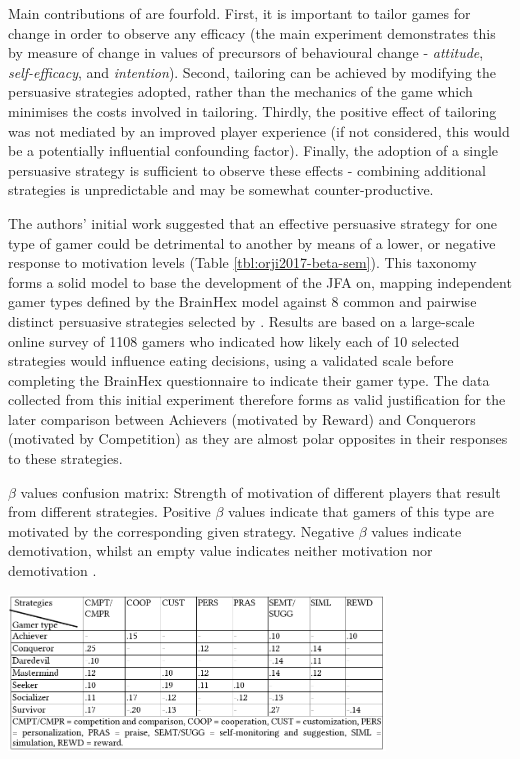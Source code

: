 \documentclass[11pt]{article}
\begin{document}
Main contributions of \citet{orji2017} are fourfold. First, it is important to tailor games for change in order to observe any efficacy (the main experiment demonstrates this by measure of change in values of precursors of behavioural change - \textit{attitude}, \textit{self-efficacy}, and \textit{intention}). Second, tailoring can be achieved by modifying the persuasive strategies adopted, rather than the mechanics of the game which minimises the costs involved in tailoring. Thirdly, the positive effect of tailoring was not mediated by an improved player experience (if not considered, this would be a potentially influential confounding factor). Finally, the adoption of a single persuasive strategy is sufficient to observe these effects - combining additional strategies is unpredictable and may be somewhat counter-productive.

The authors' initial work suggested that an effective persuasive strategy for one type of gamer could be detrimental to another by means of a lower, or negative response to motivation levels \citep{orji2013a} (Table \ref{tbl:orji2017-beta-sem}). This taxonomy forms a solid model to base the development of the JFA on, mapping independent gamer types defined by the BrainHex model \citep{nacke2014} against 8 common and pairwise distinct persuasive strategies selected by \citet{gerling2014}. Results are based on a large-scale online survey of 1108 gamers who indicated how likely each of 10 selected strategies would influence eating decisions, using a validated scale \citep{drozd2012} before completing the BrainHex questionnaire to indicate their gamer type. The data collected from this initial experiment therefore forms as valid justification for the later comparison between Achievers (motivated by Reward) and Conquerors (motivated by Competition) as they are almost polar opposites in their responses to these strategies. 

\begin{table}[H]
\centering
\caption{$\beta$ values confusion matrix: Strength of motivation of different players that result from different strategies. Positive $\beta$ values indicate that gamers of this type are motivated by the corresponding given strategy. Negative $\beta$ values indicate demotivation, whilst an empty value indicates neither motivation nor demotivation \protect\citep{orji2013a}.
}\label{tbl:orji2017-beta-sem}
\includegraphics[width=0.75\textwidth]{img/orji2017-beta-sem.png} 
\end{table}
\end{document}
